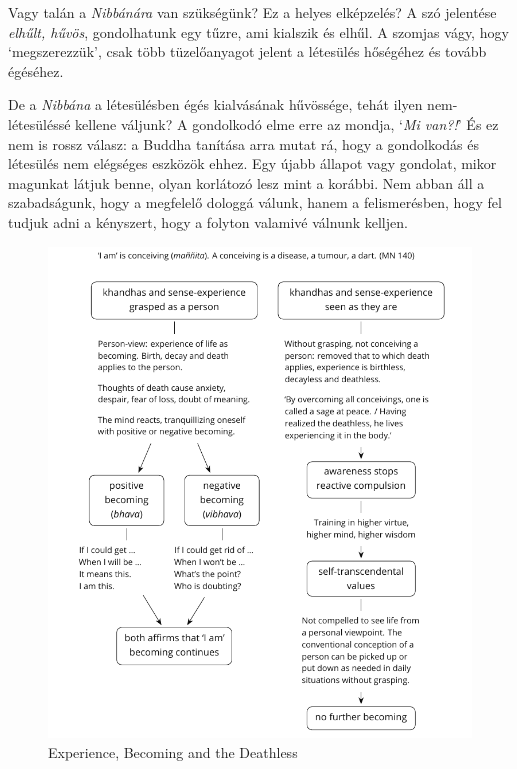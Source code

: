 Vagy talán a \emph{Nibbánára} van szükségünk? Ez a helyes elképzelés? A
szó jelentése \emph{elhűlt, hűvös}, gondolhatunk egy tűzre, ami kialszik
és elhűl. A szomjas vágy, hogy `megszerezzük', csak több tüzelőanyagot
jelent a létesülés hőségéhez és tovább égéséhez.

De a \emph{Nibbána} a létesülésben égés kialvásának hűvössége, tehát
ilyen nem-létesüléssé kellene váljunk? A gondolkodó elme erre az mondja,
`\emph{Mi van?!}' És ez nem is rossz válasz: a Buddha tanítása arra
mutat rá, hogy a gondolkodás és létesülés nem elégséges eszközök ehhez.
Egy újabb állapot vagy gondolat, mikor magunkat látjuk benne, olyan
korlátozó lesz mint a korábbi. Nem abban áll a szabadságunk, hogy a
megfelelő dologgá válunk, hanem a felismerésben, hogy fel tudjuk adni a
kényszert, hogy a folyton valamivé válnunk kelljen.

\clearpage
\figurepagelayout

\begin{figure}[h]
\caption{Experience, Becoming and the Deathless}\label{fig-experience-becoming-deathless}
\bigskip
\includegraphics[width=\linewidth]{./manuscript/tex/diagrams/experience-becoming-deathless.pdf}
\end{figure}

